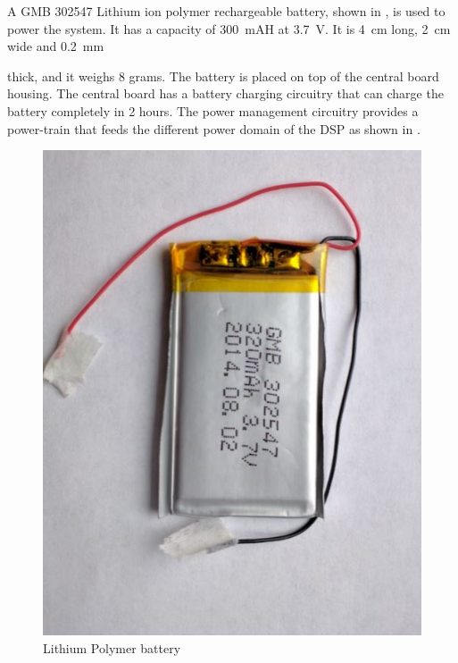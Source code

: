 A GMB 302547 Lithium ion polymer rechargeable battery, shown in
, is used to power the system. It has a
capacity of 300~mAH at 3.7~V. It is 4~cm long, 2~cm wide and 0.2~mm

thick, and it weighs 8 grams. The battery is placed on top of the
central board housing. The central board has a battery charging
circuitry that can charge the battery completely in 2 hours. The
power management circuitry provides a power-train that feeds the
different power domain of the DSP as shown in
.

 \begin{figure}
 	\centering
 	\includegraphics[scale = 0.25 ]{battery}
 	\caption{Lithium Polymer battery}\label{fig:battery}
 \end{figure}      

